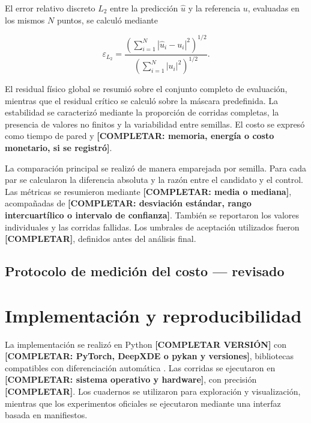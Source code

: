 El error relativo discreto $L_2$ entre la predicción $\hat{u}$ y la referencia $u$, evaluadas en los mismos $N$ puntos, se calculó mediante

$$
\varepsilon_{L_2}=\frac{\left(\sum_{i=1}^{N}|\hat{u}_i-u_i|^2\right)^{1/2}}{\left(\sum_{i=1}^{N}|u_i|^2\right)^{1/2}}.
$$

El residual físico global se resumió sobre el conjunto completo de evaluación, mientras que el residual crítico se calculó sobre la máscara predefinida. La estabilidad se caracterizó mediante la proporción de corridas completas, la presencia de valores no finitos y la variabilidad entre semillas. El costo se expresó como tiempo de pared y \textbf{[COMPLETAR: memoria, energía o costo monetario, si se registró]}.

La comparación principal se realizó de manera emparejada por semilla. Para cada par se calcularon la diferencia absoluta y la razón entre el candidato y el control. Las métricas se resumieron mediante \textbf{[COMPLETAR: media o mediana]}, acompañadas de \textbf{[COMPLETAR: desviación estándar, rango intercuartílico o intervalo de confianza]}. También se reportaron los valores individuales y las corridas fallidas. Los umbrales de aceptación utilizados fueron \textbf{[COMPLETAR]}, definidos antes del análisis final.

\subsection{Protocolo de medición del costo — revisado}


\section{Implementación y reproducibilidad}
\label{subsec:reproducibilidad}

La implementación se realizó en Python \textbf{[COMPLETAR VERSIÓN]} con \textbf{[COMPLETAR: PyTorch, DeepXDE o pykan y versiones]}, bibliotecas compatibles con diferenciación automática \cite{paszke2019pytorch,lu2021deepxde,liu2024kan}. Las corridas se ejecutaron en \textbf{[COMPLETAR: sistema operativo y hardware]}, con precisión \textbf{[COMPLETAR]}. Los cuadernos se utilizaron para exploración y visualización, mientras que los experimentos oficiales se ejecutaron mediante una interfaz basada en manifiestos.

